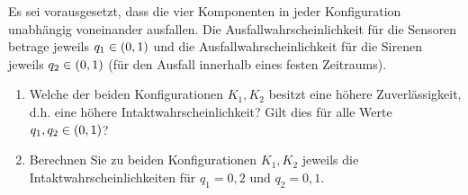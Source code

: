 \documentclass{exercise}
\begin{document}
\begin{problem}
        Es sei vorausgesetzt, dass die vier Komponenten in jeder Konfiguration unabhängig voneinander ausfallen.
        Die Ausfallwahrscheinlichkeit für die Sensoren betrage jeweils \(q_1 \in \parentheses*{0, 1}\) und die Ausfallwahrscheinlichkeit für die Sirenen jeweils \(q_2 \in \parentheses*{0, 1}\) (für den Ausfall innerhalb eines festen Zeitraums).
        \begin{enumerate}
            \item Welche der beiden Konfigurationen \(K_1, K_2\) besitzt eine höhere Zuverlässigkeit, d.h. eine höhere Intaktwahrscheinlichkeit?
            Gilt dies für alle Werte \(q_1, q_2 \in \parentheses*{0, 1}\)?
            \item Berechnen Sie zu beiden Konfigurationen \(K_1, K_2\) jeweils die Intaktwahrscheinlichkeiten für \(q_1 = 0,2\) und \(q_2 = 0,1\).
        \end{enumerate}
    \end{problem}
\end{document}

